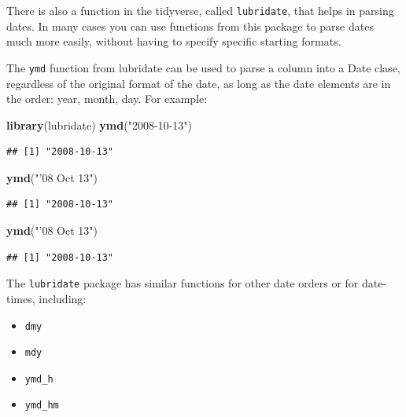 \documentclass[]{book}
\makeatletter
\newenvironment{Shaded}{\begin{snugshade}}{\end{snugshade}}
\newcommand{\KeywordTok}[1]{\textcolor[rgb]{0.13,0.29,0.53}{\textbf{#1}}}
\newcommand{\StringTok}[1]{\textcolor[rgb]{0.31,0.60,0.02}{#1}}
\newcommand{\NormalTok}[1]{#1}
\providecommand{\tightlist}{%
  \setlength{\itemsep}{0pt}\setlength{\parskip}{0pt}}
\newenvironment{kframe}{%
\medskip{}
\setlength{\fboxsep}{.8em}
 \def\at@end@of@kframe{}%
 \ifinner\ifhmode%
  \def\at@end@of@kframe{\end{minipage}}%
  \begin{minipage}{\columnwidth}%
 \fi\fi%
 \def\FrameCommand##1{\hskip\@totalleftmargin \hskip-\fboxsep
 \colorbox{shadecolor}{##1}\hskip-\fboxsep
     \hskip-\linewidth \hskip-\@totalleftmargin \hskip\columnwidth}%
 \MakeFramed {\advance\hsize-\width
   \@totalleftmargin\z@ \linewidth\hsize
   \@setminipage}}%
 {\par\unskip\endMakeFramed%
 \at@end@of@kframe}
\renewenvironment{Shaded}{\begin{kframe}}{\end{kframe}}
\theoremstyle{definition}
\theoremstyle{definition}
\theoremstyle{definition}
\theoremstyle{remark}
\makeatother
\begin{document}
There is also a function in the tidyverse, called \texttt{lubridate},
that helps in parsing dates. In many cases you can use functions from
this package to parse dates much more easily, without having to specify
specific starting formats.

The \texttt{ymd} function from lubridate can be used to parse a column
into a Date clase, regardless of the original format of the date, as
long as the date elements are in the order: year, month, day. For
example:

\begin{Shaded}
\begin{Highlighting}[]
\KeywordTok{library}\NormalTok{(lubridate)}
\KeywordTok{ymd}\NormalTok{(}\StringTok{"2008-10-13"}\NormalTok{)}
\end{Highlighting}
\end{Shaded}

\begin{verbatim}
## [1] "2008-10-13"
\end{verbatim}

\begin{Shaded}
\begin{Highlighting}[]
\KeywordTok{ymd}\NormalTok{(}\StringTok{"'08 Oct 13"}\NormalTok{)}
\end{Highlighting}
\end{Shaded}

\begin{verbatim}
## [1] "2008-10-13"
\end{verbatim}

\begin{Shaded}
\begin{Highlighting}[]
\KeywordTok{ymd}\NormalTok{(}\StringTok{"'08 Oct 13"}\NormalTok{)}
\end{Highlighting}
\end{Shaded}

\begin{verbatim}
## [1] "2008-10-13"
\end{verbatim}

The \texttt{lubridate} package has similar functions for other date
orders or for date-times, including:

\begin{itemize}
\tightlist
\item
  \texttt{dmy}
\item
  \texttt{mdy}
\item
  \texttt{ymd\_h}
\item
  \texttt{ymd\_hm}
\end{itemize}
\end{document}
